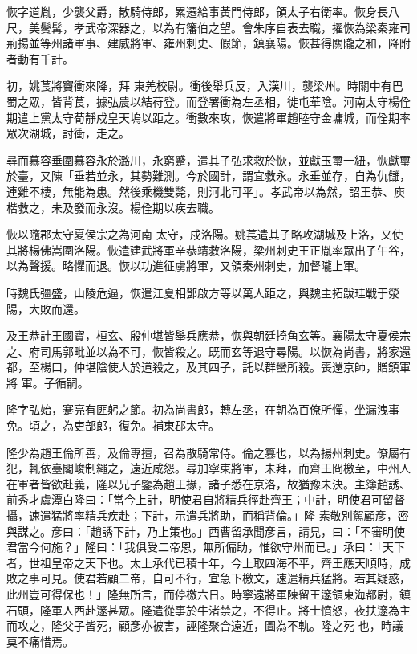 \begin{pinyinscope}
 恢字道胤，少襲父爵，散騎侍郎，累遷給事黃門侍郎，領太子右衛率。恢身長八尺，美鬢髯，孝武帝深器之，以為有籓伯之望。會朱序自表去職，擢恢為梁秦雍司荊揚並等州諸軍事、建威將軍、雍州刺史、假節，鎮襄陽。恢甚得關隴之和，降附者動有千計。



 初，姚萇將竇衝來降，拜
 東羌校尉。衝後舉兵反，入漢川，襲梁州。時關中有巴蜀之眾，皆背萇，據弘農以結苻登。而登署衝為左丞相，徙屯華陰。河南太守楊佺期遣上黨太守荀靜戍皇天塢以距之。衝數來攻，恢遣將軍趙睦守金墉城，而佺期率眾次湖城，討衝，走之。



 尋而慕容垂圍慕容永於潞川，永窮蹙，遣其子弘求救於恢，並獻玉璽一紐，恢獻璽於臺，又陳「垂若並永，其勢難測。今於國計，謂宜救永。永垂並存，自為仇讎，連雞不棲，無能為患。然後乘機雙斃，則河北可平」。孝武帝以為然，詔王恭、庾楷救之，未及發而永沒。楊佺期以疾去職。



 恢以隨郡太守夏侯宗之為河南
 太守，戍洛陽。姚萇遣其子略攻湖城及上洛，又使其將楊佛嵩圍洛陽。恢遣建武將軍辛恭靖救洛陽，梁州刺史王正胤率眾出子午谷，以為聲援。略懼而退。恢以功進征虜將軍，又領秦州刺史，加督隴上軍。



 時魏氏彊盛，山陵危逼，恢遣江夏相鄧啟方等以萬人距之，與魏主拓跋珪戰于滎陽，大敗而還。



 及王恭計王國寶，桓玄、殷仲堪皆舉兵應恭，恢與朝廷掎角玄等。襄陽太守夏侯宗之、府司馬郭毗並以為不可，恢皆殺之。既而玄等退守尋陽。以恢為尚書，將家還都，至楊口，仲堪陰使人於道殺之，及其四子，託以群蠻所殺。喪還京師，贈鎮軍將
 軍。子循嗣。



 隆字弘始，蹇亮有匪躬之節。初為尚書郎，轉左丞，在朝為百僚所憚，坐漏洩事免。頃之，為吏部郎，復免。補東郡太守。



 隆少為趙王倫所善，及倫專擅，召為散騎常侍。倫之篡也，以為揚州刺史。僚屬有犯，輒依臺閣峻制繩之，遠近咸怨。尋加寧東將軍，未拜，而齊王冏檄至，中州人在軍者皆欲赴義，隆以兄子鑒為趙王掾，諸子悉在京洛，故猶豫未決。主簿趙誘、前秀才虞潭白隆曰：「當今上計，明使君自將精兵徑赴齊王；中計，明使君可留督攝，速遣猛將率精兵疾赴；下計，示遣兵將助，而稱背倫。」隆
 素敬別駕顧彥，密與謀之。彥曰：「趙誘下計，乃上策也。」西曹留承聞彥言，請見，曰：「不審明使君當今何施？」隆曰：「我俱受二帝恩，無所偏助，惟欲守州而已。」承曰：「天下者，世祖皇帝之天下也。太上承代已積十年，今上取四海不平，齊王應天順時，成敗之事可見。使君若顧二帝，自可不行，宜急下檄文，速遣精兵猛將。若其疑惑，此州豈可得保也！」隆無所言，而停檄六日。時寧遠將軍陳留王邃領東海都尉，鎮石頭，隆軍人西赴邃甚眾。隆遣從事於牛渚禁之，不得止。將士憤怒，夜扶邃為主而攻之，隆父子皆死，顧彥亦被害，誣隆聚合遠近，圖為不軌。隆之死
 也，時議莫不痛惜焉。




\end{pinyinscope}
